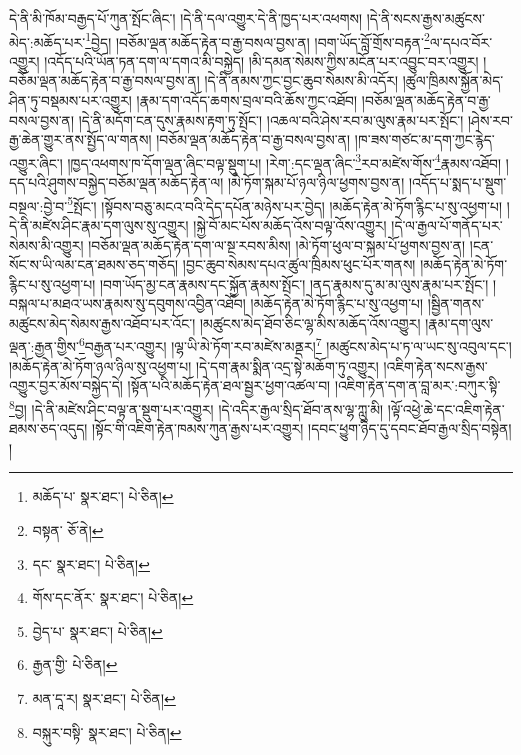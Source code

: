 དེ་ནི་མི་ཁོམ་བརྒྱད་པོ་ཀུན་སྤོང་ཞིང་། །དེ་ནི་དལ་འགྱུར་དེ་ནི་ཁྱད་པར་འཕགས། །དེ་ནི་སངས་རྒྱས་མཚུངས་མེད་:མཆོད་པར་\footnote{མཆོད་པ་  སྣར་ཐང་།  པེ་ཅིན། }བྱེད། །བཅོམ་ལྡན་མཆོད་རྟེན་བ་རྒྱ་བསལ་བྱས་ན། །བག་ཡོད་བློ་གྲོས་བརྟན་\footnote{བསྟན་  ཅོ་ནེ། }ལ་དཔའ་བོར་འགྱུར། །འདོད་པའི་ཡོན་ཏན་དག་ལ་དགའ་མི་བསྐྱེད། །མི་དམན་སེམས་ཀྱིས་མངོན་པར་འབྱུང་བར་འགྱུར། །བཅོམ་ལྡན་མཆོད་རྟེན་བ་རྒྱ་བསལ་བྱས་ན། །དེ་ནི་ནམས་ཀྱང་བྱང་ཆུབ་སེམས་མི་འདོར། །ཚུལ་ཁྲིམས་སྐྱོན་མེད་ཤིན་ཏུ་བསྡམས་པར་འགྱུར། །རྣམ་དག་འདོད་ཆགས་བྲལ་བའི་ཆོས་ཀྱང་འཐོབ། །བཅོམ་ལྡན་མཆོད་རྟེན་བ་རྒྱ་བསལ་བྱས་ན། །དེ་ནི་མདོག་ངན་དུས་རྣམས་རྟག་ཏུ་སྤོང་། །འཆལ་བའི་ཤེས་རབ་མ་ལུས་རྣམ་པར་སྤོང་། །ཤེས་རབ་རྒྱ་ཆེན་གྱུར་ནས་སྤྱོད་ལ་གནས། །བཅོམ་ལྡན་མཆོད་རྟེན་བ་རྒྱ་བསལ་བྱས་ན། །ཁ་ཟས་གཙང་མ་དག་ཀྱང་རྙེད་འགྱུར་ཞིང་། །ཁྱད་འཕགས་ཁ་དོག་ལྡན་ཞིང་བལྟ་སྡུག་པ། །རེག་:དང་ལྡན་ཞིང་\footnote{དང་  སྣར་ཐང་།  པེ་ཅིན། }རབ་མཛེས་གོས་\footnote{གོས་དང་ནོར་  སྣར་ཐང་།  པེ་ཅིན། }རྣམས་འཐོབ། །དད་པའི་ཤུགས་བསྐྱེད་བཅོམ་ལྡན་མཆོད་རྟེན་ལ། །མེ་ཏོག་སྐམ་པོ་ཉལ་ཉིལ་ཕྱགས་བྱས་ན། །འདོད་པ་སྨད་པ་སྡུག་བསྔལ་:བྱེ་བ་\footnote{བྱེད་པ་  སྣར་ཐང་།  པེ་ཅིན། }སྤོང་། །སྟོབས་བཅུ་མངའ་བའི་དེད་དཔོན་མཉེས་པར་བྱེད། །མཆོད་རྟེན་མེ་ཏོག་རྙིང་པ་སུ་འཕྱག་པ། །དེ་ནི་མཛེས་ཤིང་རྣམ་དག་ལུས་སུ་འགྱུར། །སྐྱེ་བོ་མང་པོས་མཆོད་འོས་བལྟ་འོས་འགྱུར། །དེ་ལ་རྒྱལ་པོ་གནོད་པར་སེམས་མི་འགྱུར། །བཅོམ་ལྡན་མཆོད་རྟེན་དག་ལ་སྔ་རབས་མིས། །མེ་ཏོག་ཕུལ་བ་སྐམ་པོ་ཕྱགས་བྱས་ན། །ངན་སོང་ས་ཡི་ལམ་ངན་ཐམས་ཅད་གཅོད། །བྱང་ཆུབ་སེམས་དཔའ་ཚུལ་ཁྲིམས་ཕུང་པོར་གནས། །མཆོད་རྟེན་མེ་ཏོག་རྙིང་པ་སུ་འཕྱག་པ། །བག་ཡོད་མྱ་ངན་རྣམས་དང་སྐྱོན་རྣམས་སྤོང་། །ནད་རྣམས་དུ་མ་མ་ལུས་རྣམ་པར་སྤོང་། །བསྐལ་པ་མཐའ་ཡས་རྣམས་སུ་དབུགས་འབྱིན་འཐོབ། །མཆོད་རྟེན་མེ་ཏོག་རྙིང་པ་སུ་འཕྱག་པ། །སྦྱིན་གནས་མཚུངས་མེད་སེམས་རྒྱས་འཐོབ་པར་འོང་། །མཚུངས་མེད་ཐོབ་ཅིང་ལྷ་མིས་མཆོད་འོས་འགྱུར། །རྣམ་དག་ལུས་ལྡན་:རྒྱན་གྱིས་\footnote{རྒྱན་གྱི་  པེ་ཅིན། }བརྒྱན་པར་འགྱུར། །ལྷ་ཡི་མེ་ཏོག་རབ་མཛེས་མནྡར།\footnote{མན་དཱ་ར།  སྣར་ཐང་།  པེ་ཅིན། } །མཚུངས་མེད་པ་ཏ་ལ་ཡང་སུ་འབུལ་དང་། །མཆོད་རྟེན་མེ་ཏོག་ཉལ་ཉིལ་སུ་འཕྱག་པ། །དེ་དག་རྣམ་སྨིན་འདྲ་སྟེ་མཆོག་ཏུ་འགྱུར། །འཇིག་རྟེན་སངས་རྒྱས་འགྱུར་བྱར་མོས་བསྐྱེད་དེ། །སྟོན་པའི་མཆོད་རྟེན་ཐལ་སྦྱར་ཕྱག་འཚལ་བ། །འཇིག་རྟེན་དག་ན་བླ་མར་:བཀུར་སྟི་\footnote{བསྐུར་བསྟི་  སྣར་ཐང་།  པེ་ཅིན། }བྱ། །དེ་ནི་མཛེས་ཤིང་བལྟ་ན་སྡུག་པར་འགྱུར། །དེ་འདིར་རྒྱལ་སྲིད་ཐོབ་ནས་ལྷ་ཀླུ་མི། །ལྟོ་འཕྱེ་ཆེ་དང་འཇིག་རྟེན་ཐམས་ཅད་འདུད། །སྟོང་གི་འཇིག་རྟེན་ཁམས་ཀུན་རྒྱས་པར་འགྱུར། །དབང་ཕྱུག་ཉིད་དུ་དབང་ཐོབ་རྒྱལ་སྲིད་བསྟེན། །
